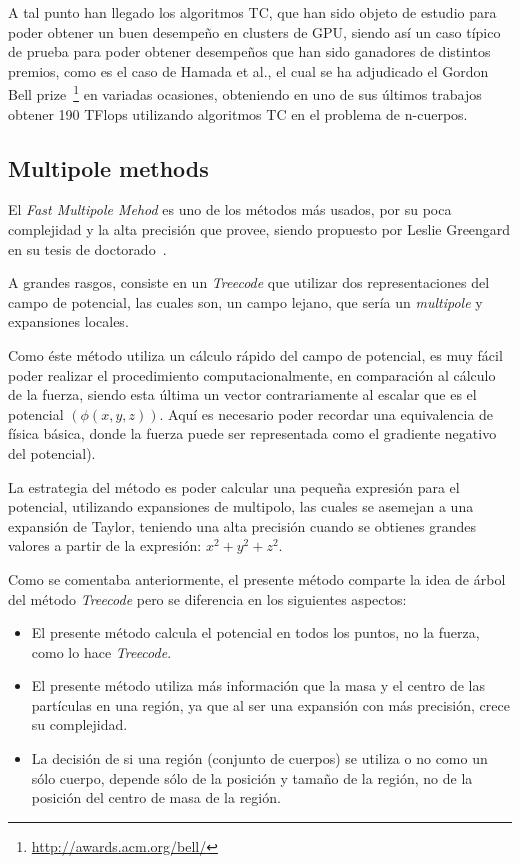A tal punto han llegado los algoritmos TC,
que han sido objeto de estudio para poder obtener
un buen desempeño en clusters de GPU,
siendo así un caso típico de prueba
para poder obtener desempeños que han sido
ganadores de distintos premios, como es el caso de
Hamada et al.\cite{hamada}, el cual se ha adjudicado
el Gordon Bell prize~\footnote{\url{http://awards.acm.org/bell/}}
en variadas ocasiones, obteniendo en uno de sus últimos
trabajos obtener 190 TFlops utilizando algoritmos
TC en el problema de n-cuerpos.

\subsection{Multipole methods}

El \emph{Fast Multipole Mehod} es uno de los métodos
más usados, por su poca complejidad y la alta precisión que provee,
siendo propuesto por Leslie Greengard en su tesis de doctorado~\cite{leslie}.

A grandes rasgos, consiste en un \emph{Treecode} que utilizar
dos representaciones del campo de potencial,
las cuales son, un campo lejano, que sería un \emph{multipole}
y expansiones locales.

Como éste método utiliza un cálculo rápido del campo de potencial,
es muy fácil poder realizar el procedimiento computacionalmente,
en comparación al cálculo de la fuerza, siendo esta última
un vector contrariamente al escalar que es el potencial $(\phi (x,y,z))$.
Aquí es necesario poder recordar una equivalencia de física
básica, donde la fuerza puede ser representada como el gradiente
negativo del potencial).

La estrategia del método es poder calcular una pequeña expresión
para el potencial, utilizando expansiones de multipolo, las
cuales se asemejan a una expansión de Taylor,
teniendo una alta precisión cuando se obtienes grandes
valores a partir de la expresión: $x^{2} + y^{2} + z^{2}$.

Como se comentaba anteriormente,
el presente método comparte la idea de árbol del método \emph{Treecode}
pero se diferencia en los siguientes aspectos:

\begin{itemize}
	\item El presente método calcula el potencial en todos los puntos,
		no la fuerza, como lo hace \emph{Treecode}.
	\item El presente método utiliza más información que la masa
		y el centro de las partículas en una región, ya que al ser
		una expansión con más precisión, crece su complejidad.
	\item La decisión de si una región (conjunto de cuerpos) se utiliza o no
		como un sólo cuerpo, depende sólo de la posición y tamaño
		de la región, no de la posición del centro de masa de la región.
\end{itemize}

